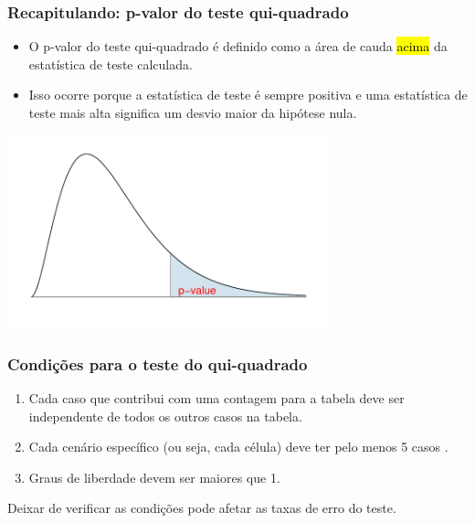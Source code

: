
\begin{frame}
\frametitle{Recapitulando: p-valor do teste qui-quadrado}

\begin{itemize}
\justifying
\item O p-valor do teste qui-quadrado é definido como a área de cauda \hl{acima} da estatística de teste calculada.
\justifying
\item Isso ocorre porque a estatística de teste é sempre positiva e uma estatística de teste mais alta significa um desvio maior da hipótese nula.

\end{itemize}

\begin{center}
\includegraphics[width=0.7\textwidth]{6-3_chisq_gof/genericChiSquare.pdf}
\end{center}

\end{frame}


\begin{frame}
\frametitle{Condições para o teste do qui-quadrado}

\begin{enumerate}
\justifying
\item {} Cada caso que contribui com uma contagem para a tabela deve ser independente de todos os outros casos na tabela.

\pause
\justifying
\item {} Cada cenário específico (ou seja, cada célula) deve ter pelo menos 5 casos .

\pause
\justifying
\item {} Graus de liberdade devem ser maiores que 1.

\end{enumerate}

\pause
\justifying
Deixar de verificar as condições pode afetar as taxas de erro do teste.

\end{frame}

